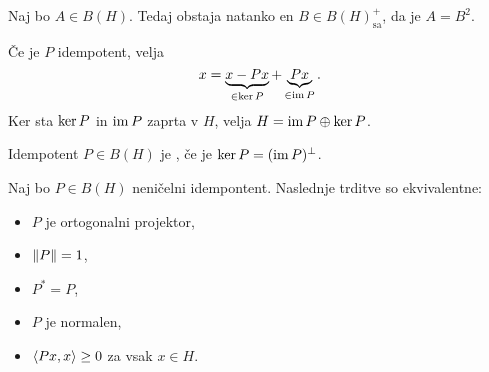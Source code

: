 \begin{izrek}
  Naj bo $A \in B(H)$.
  Tedaj obstaja natanko en $B \in B(H)_{\text{sa}}^+$, da je $A = B^2$.
\end{izrek}


Če je $P$ idempotent, velja
\[
  x = \underbrace{x - Px}_{\in \operatorname{ker} P} + \underbrace{Px}_{\in \operatorname{im} P}.
\]
Ker sta $\operatorname{ker} P$ in $\operatorname{im} P$ zaprta v $H$, velja $H = \operatorname{im} P \oplus \operatorname{ker} P$.

\begin{definicija}
  Idempotent $P \in B(H)$ je , če je $\operatorname{ker} P =
  (\operatorname{im} P)^\bot$.
\end{definicija}

\begin{izrek}
  Naj bo $P \in B(H)$ neničelni idempontent.
  Naslednje trditve so ekvivalentne:
  \begin{itemize}
  \item $P$ je ortogonalni projektor,
  \item $\left\lVert P\right\rVert = 1$,
  \item $P^* = P$,
  \item $P$ je normalen,
  \item $\left< Px, x \right> \ge 0$ za vsak $x \in H$.
  \end{itemize}
\end{izrek}

